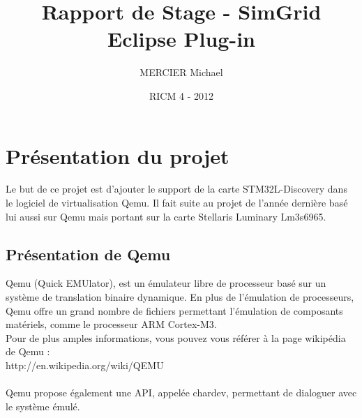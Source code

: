 \documentclass{article}
\title{Rapport de Stage - SimGrid Eclipse Plug-in}
\author{MERCIER Michael}
\date{RICM 4 - 2012}
\makeatletter
\def\thetitle{\@title}
\def\theauthor{\@author}
\def\thedate{\@date}
\makeatother
\begin{document}
\begin{titlepage}
\centering

\vfill

{\Huge\bfseries \thetitle}

\vskip 1cm

{\Large \theauthor}

\vskip 0.5cm

\thedate

\vfill
\end{titlepage}


\tableofcontents

\newpage
\section{Présentation du projet}
	 Le but de ce projet est d'ajouter le support de la carte STM32L-Discovery dans le logiciel de virtualisation Qemu. 
	 Il fait suite au projet de l'année dernière basé lui aussi sur Qemu mais portant sur la carte Stellaris Luminary Lm3s6965.
	 
	 \subsection{Présentation de Qemu}
		Qemu (Quick EMUlator), est un émulateur libre de processeur basé sur un système de translation binaire dynamique. En plus de 
		l'émulation de processeurs, Qemu offre un grand nombre de fichiers permettant l'émulation de composants matériels, comme le 
		processeur ARM Cortex-M3. \\
		Pour de plus amples informations, vous pouvez vous référer à la page wikipédia de Qemu : \\ http://en.wikipedia.org/wiki/QEMU \\
		\\
		Qemu propose également une API, appelée chardev, permettant de dialoguer avec le système émulé.
	 
\end{document}

